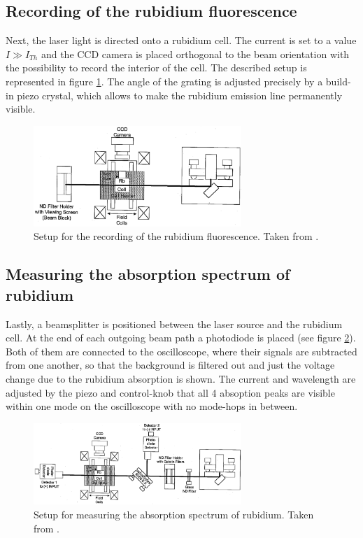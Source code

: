         \subsection{Recording of the rubidium fluorescence}
            Next, the laser light is directed onto a rubidium cell.
            The current is set to a value $I\gg I_{Th}$ and
            the CCD camera is placed orthogonal to the beam orientation
            with the possibility to record the interior of the cell.
            The described setup is represented in figure \ref{fig:Aufbau2}.
            The angle of the grating is adjusted precisely by a build-in piezo crystal,
            which allows to make the rubidium emission line permanently visible.
            \begin{figure}[h]
                \centering
                \includegraphics[width = 0.7\textwidth]{pictures/Aufbau2.png}
                \caption{Setup for the recording of the rubidium fluorescence. Taken from \cite{tu_dortmund_versuchsanleitung_2022-1}.}
                \label{fig:Aufbau2}
            \end{figure}
        \subsection{Measuring the absorption spectrum of rubidium}
            Lastly, a beamsplitter is positioned between the laser source and the rubidium cell.
            At the end of each outgoing beam path a photodiode is placed (see figure \ref{fig:Aufbau3}).
            Both of them are connected to the oscilloscope,
            where their signals are subtracted from one another,
            so that the background is filtered out and
            just the voltage change due to the rubidium absorption is shown.
            The current and wavelength are adjusted by the piezo and control-knob that
            all 4 absoption peaks are visible within one mode on the oscilloscope with no mode-hops in between.
            \begin{figure}[h]
                \centering
                \includegraphics[width = 0.7\textwidth]{pictures/Aufbau3.png}
                \caption{Setup for measuring the absorption spectrum of rubidium. Taken from \cite{tu_dortmund_versuchsanleitung_2022-1}.}
                \label{fig:Aufbau3}
            \end{figure}
